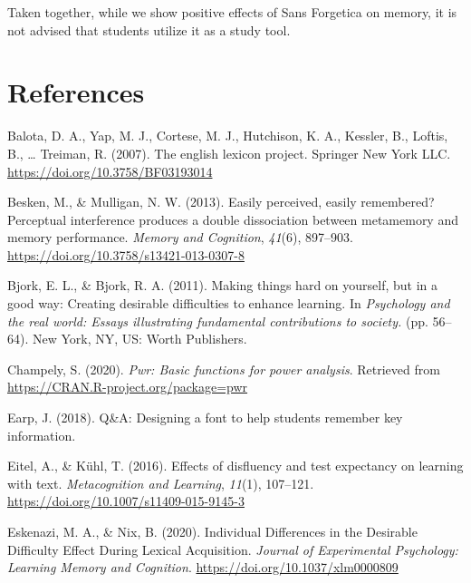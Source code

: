 \documentclass[
  english,
  jou]{apa6}
\begin{document}
Taken together, while we show positive effects of Sans Forgetica on memory, it is not advised that students utilize it as a study tool.

\newpage

\hypertarget{references}{%
\section{References}\label{references}}

\begingroup
\setlength{\parindent}{-0.5in}
\setlength{\leftskip}{0.5in}

\hypertarget{refs}{}
\leavevmode\hypertarget{ref-Balota2007}{}%
Balota, D. A., Yap, M. J., Cortese, M. J., Hutchison, K. A., Kessler, B., Loftis, B., \ldots{} Treiman, R. (2007). The english lexicon project. Springer New York LLC. \url{https://doi.org/10.3758/BF03193014}

\leavevmode\hypertarget{ref-Besken2013}{}%
Besken, M., \& Mulligan, N. W. (2013). Easily perceived, easily remembered? Perceptual interference produces a double dissociation between metamemory and memory performance. \emph{Memory and Cognition}, \emph{41}(6), 897--903. \url{https://doi.org/10.3758/s13421-013-0307-8}

\leavevmode\hypertarget{ref-Bjork2011}{}%
Bjork, E. L., \& Bjork, R. A. (2011). Making things hard on yourself, but in a good way: Creating desirable difficulties to enhance learning. In \emph{Psychology and the real world: Essays illustrating fundamental contributions to society.} (pp. 56--64). New York, NY, US: Worth Publishers.

\leavevmode\hypertarget{ref-Champely2020}{}%
Champely, S. (2020). \emph{Pwr: Basic functions for power analysis}. Retrieved from \url{https://CRAN.R-project.org/package=pwr}

\leavevmode\hypertarget{ref-Earp2018}{}%
Earp, J. (2018). Q\&A: Designing a font to help students remember key information.

\leavevmode\hypertarget{ref-Eitel2016}{}%
Eitel, A., \& Kühl, T. (2016). Effects of disfluency and test expectancy on learning with text. \emph{Metacognition and Learning}, \emph{11}(1), 107--121. \url{https://doi.org/10.1007/s11409-015-9145-3}

\leavevmode\hypertarget{ref-Eskenazi2020}{}%
Eskenazi, M. A., \& Nix, B. (2020). Individual Differences in the Desirable Difficulty Effect During Lexical Acquisition. \emph{Journal of Experimental Psychology: Learning Memory and Cognition}. \url{https://doi.org/10.1037/xlm0000809}
\end{document}
